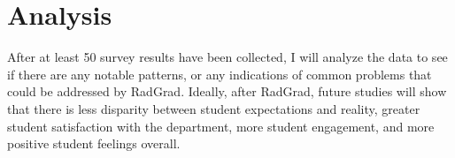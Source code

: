 \section{Analysis}
After at least 50 survey results have been collected, I will analyze the data to see if there are any notable patterns, or any indications of common problems that could be addressed by RadGrad. Ideally, after RadGrad, future studies will show that there is less disparity between student expectations and reality, greater student satisfaction with the department, more student engagement, and more positive student feelings overall.
